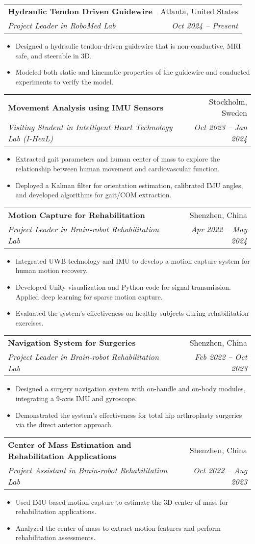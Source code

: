 \documentclass[letterpaper,11pt]{article}
\makeatletter
\newcommand{\resumeItem}[1]{
  \item\small{
    {#1 \vspace{-2pt}}
  }
}
\newcommand{\resumeSubheading}[4]{
  \vspace{-2pt}\item
  \begin{tabular*}{0.97\textwidth}[t]{l@{\extracolsep{\fill}}r}
    \textbf{#1} & #2 \\
    \textit{\small#3} & \textit{\small #4} \\
  \end{tabular*}\vspace{-7pt}
}
\newcommand{\resumeItemListStart}{\begin{itemize}}
\newcommand{\resumeItemListEnd}{\end{itemize}\vspace{-5pt}}
\makeatother
\begin{document}
\resumeSubheading
{Hydraulic Tendon Driven Guidewire}{Atlanta, United States}
{Project Leader in RoboMed Lab}{Oct 2024 -- Present}
\resumeItemListStart
\resumeItem{Designed a hydraulic tendon-driven guidewire that is non-conductive, MRI safe, and steerable in 3D.}
\resumeItem{Modeled both static and kinematic properties of the guidewire and conducted experiments to verify the model.}
\resumeItemListEnd

\resumeSubheading
{Movement Analysis using IMU Sensors}{Stockholm, Sweden}
{Visiting Student in Intelligent Heart Technology Lab (I-HeaL)}{Oct 2023 -- Jan 2024}
\resumeItemListStart
\resumeItem{Extracted gait parameters and human center of mass to explore the relationship between human movement and cardiovascular function.}
\resumeItem{Deployed a Kalman filter for orientation estimation, calibrated IMU angles, and developed algorithms for gait/COM extraction.}
\resumeItemListEnd

\resumeSubheading
{Motion Capture for Rehabilitation}{Shenzhen, China}
{Project Leader in Brain-robot Rehabilitation Lab}{Apr 2022 -- May 2024}
\resumeItemListStart
\resumeItem{Integrated UWB technology and IMU to develop a motion capture system for human motion recovery.}
\resumeItem{Developed Unity visualization and Python code for signal transmission.
  Applied deep learning for sparse motion capture.
}
\resumeItem{Evaluated the system’s effectiveness on healthy subjects during rehabilitation exercises.}
\resumeItemListEnd

\resumeSubheading
{Navigation System for Surgeries}{Shenzhen, China}
{Project Leader in Brain-robot Rehabilitation Lab}{Feb 2022 -- Oct 2023}
\resumeItemListStart
\resumeItem{Designed a surgery navigation system with on-handle and on-body modules, integrating a 9-axis IMU and gyroscope.}
\resumeItem{Demonstrated the system’s effectiveness for total hip arthroplasty surgeries via the direct anterior approach.}
\resumeItemListEnd

\resumeSubheading
{Center of Mass Estimation and Rehabilitation Applications}{Shenzhen, China}
{Project Assistant in Brain-robot Rehabilitation Lab}{Oct 2022 -- Aug 2023}
\resumeItemListStart
\resumeItem{Used IMU-based motion capture to estimate the 3D center of mass for rehabilitation applications.}
\resumeItem{Analyzed the center of mass to extract motion features and perform rehabilitation assessments.}
\resumeItemListEnd
\end{document}
